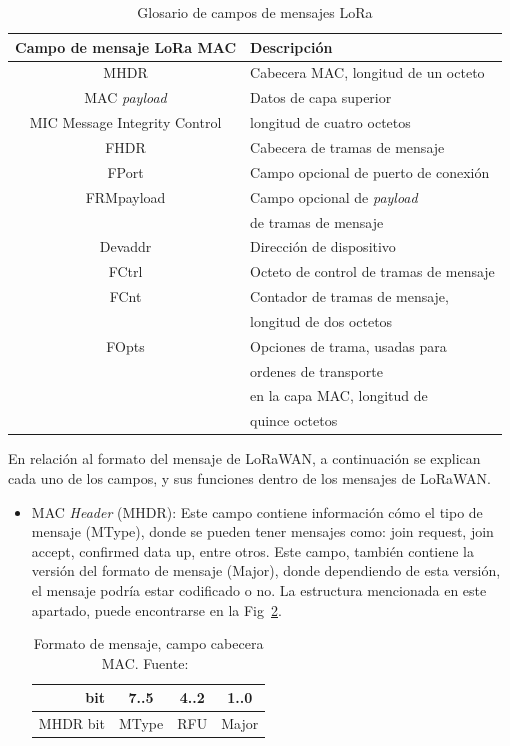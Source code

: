 \begin{justify}
\begin{table}[!ht]
\begin{tabular}{|c|l|}
\hline
Campo de mensaje LoRa MAC & Descripción \\\hline
MHDR & Cabecera	MAC, longitud de un octeto\\\hline
MAC \textit{payload}	& Datos de capa superior\\\hline
MIC	Message Integrity Control & longitud de cuatro octetos\\\hline
FHDR  &	Cabecera de tramas de mensaje\\\hline
FPort	& Campo opcional de puerto de conexión\\\hline
FRMpayload	& Campo opcional de \textit{payload} \\&de tramas de mensaje\\\hline
Devaddr	& Dirección de dispositivo\\\hline
FCtrl & Octeto de control de tramas de mensaje\\\hline
FCnt &	Contador de tramas de mensaje,\\& longitud de dos octetos\\\hline
FOpts &	Opciones de trama, usadas para \\&ordenes de transporte\\ & en la capa MAC, longitud de \\&quince octetos\\\hline
\end{tabular}
\caption{Glosario de campos de mensajes LoRa}
\label{tab:loramsg}
\end{table}
En relación al formato del mensaje de LoRaWAN, a continuación se explican cada uno de los campos, y sus funciones dentro de los mensajes de LoRaWAN.\\
\begin{itemize}
\item MAC \textit{Header} (MHDR): Este campo contiene información cómo el tipo de mensaje (MType), donde se pueden tener mensajes como: join request, join accept, confirmed data up, entre otros. Este campo, también contiene la versión del formato de mensaje (Major), donde dependiendo de esta versión, el mensaje podría estar codificado o no. La estructura mencionada en este apartado, puede encontrarse en la Fig~\ref{msg:1}.

\begin{table}[!ht]
\centering
\begin{tabular}{|r|c|c|c|}
\hline
bit & 7..5 & 4..2 & 1..0 \\\hline
MHDR bit & MType & RFU & Major\\\hline
\end{tabular}
\caption{Formato de mensaje, campo cabecera MAC. Fuente:~\cite{Sornin}}
\label{msg:1}
\end{table}


\end{itemize}
\end{justify}
